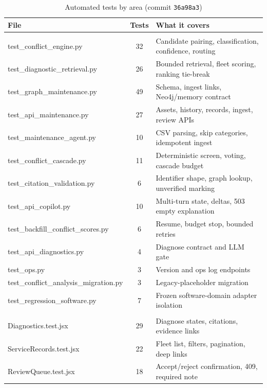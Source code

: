 \begin{table}[H]
\centering
\caption{Automated tests by area (commit \texttt{36a98a3})}
\label{tab:tests-by-area}
\small
\begin{tabularx}{\textwidth}{@{}>{\ttfamily\raggedright\arraybackslash}p{} c L@{}}
\toprule
\normalfont File & Tests & What it covers \\
\midrule
{} \\
\midrule
test\_conflict\_engine.py & 32 & Candidate pairing, classification, confidence, routing \\
test\_diagnostic\_retrieval.py & 26 & Bounded retrieval, fleet scoring, ranking tie-break \\
test\_graph\_maintenance.py & 49 & Schema, ingest links, Neo4j/memory contract \\
test\_api\_maintenance.py & 27 & Assets, history, records, ingest, review APIs \\
test\_maintenance\_agent.py & 10 & CSV parsing, skip categories, idempotent ingest \\
test\_conflict\_cascade.py & 11 & Deterministic screen, voting, cascade budget \\
test\_citation\_validation.py & 6 & Identifier shape, graph lookup, unverified marking \\
test\_api\_copilot.py & 10 & Multi-turn state, deltas, 503 empty explanation \\
test\_backfill\_conflict\_scores.py & 6 & Resume, budget stop, bounded retries \\
test\_api\_diagnostics.py & 4 & Diagnose contract and LLM gate \\
test\_ops.py & 3 & Version and ops log endpoints \\
test\_conflict\_analysis\_migration.py & 3 & Legacy-placeholder migration \\
test\_regression\_software.py & 7 & Frozen software-domain adapter isolation \\
\midrule
{} \\
\midrule
Diagnostics.test.jsx & 29 & Diagnose states, citations, evidence links \\
ServiceRecords.test.jsx & 22 & Fleet list, filters, pagination, deep links \\
ReviewQueue.test.jsx & 18 & Accept/reject confirmation, 409, required note \\

\end{tabularx}
\end{table}
